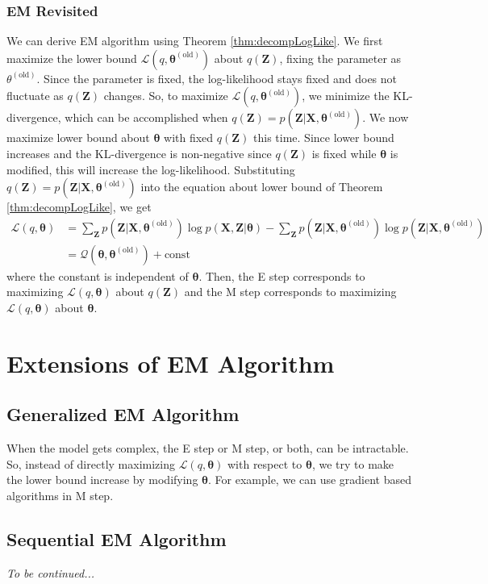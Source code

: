 \documentclass{article}
\begin{document}
        \subsubsection{EM Revisited}
            We can derive EM algorithm using Theorem \ref{thm:decompLogLike}. We first maximize the lower bound $\mathcal{L}(q,\bm\theta^{(\text{old})})$ about $q(\textbf{Z})$,
            fixing the parameter as $\theta^{(\text{old})}$. Since the parameter is fixed, the log-likelihood stays fixed and does not fluctuate as $q(\textbf{Z})$ changes.
            So, to maximize $\mathcal{L}(q,\bm\theta^{(\text{old})})$, we minimize the KL-divergence, which can be accomplished when $q(\textbf{Z})=p(\textbf{Z}|\textbf{X},\bm\theta^{(\text{old})})$.
            We now maximize lower bound about $\bm\theta$ with fixed $q(\textbf{Z})$ this time. Since lower bound increases and the KL-divergence is non-negative since
            $q(\textbf{Z})$ is fixed while $\bm\theta$ is modified, this will increase the log-likelihood.
            Substituting $q(\textbf{Z})=p(\textbf{Z}|\textbf{X},\bm\theta^{(\text{old})})$ into the equation about lower bound of
            Theorem \ref{thm:decompLogLike}, we get
            \begin{align*}
            \mathcal{L}(q,\bm\theta) &= \sum_{\textbf{Z}}p(\textbf{Z}|\textbf{X},\bm\theta^{(\text{old})})\log{p(\textbf{X},\textbf{Z}|\bm\theta)}
            -\sum_{\textbf{Z}}p(\textbf{Z}|\textbf{X},\bm\theta^{(\text{old})})\log{p(\textbf{Z}|\textbf{X}, \bm\theta^{(\text{old})})}
            \\ &=\mathcal{Q}(\bm\theta,\bm\theta^{(\text{old})}) + \text{const}
            \end{align*}
            where the constant is independent of $\bm\theta$. Then, the E step corresponds to maximizing $\mathcal{L}(q,\bm\theta)$ about $q(\textbf{Z})$
            and the M step corresponds to maximizing $\mathcal{L}(q,\bm\theta)$ about $\bm\theta$.

\section{Extensions of EM Algorithm}
    \subsection{Generalized EM Algorithm}
        When the model gets complex, the E step or M step, or both, can be intractable. So, instead of directly maximizing $\mathcal{L}(q,\bm\theta)$ with respect to $\bm\theta$,
        we try to make the lower bound increase by modifying $\bm\theta$. For example, we can use gradient based algorithms in M step.

    \subsection{Sequential EM Algorithm}
        \emph{To be continued...}
\end{document}
